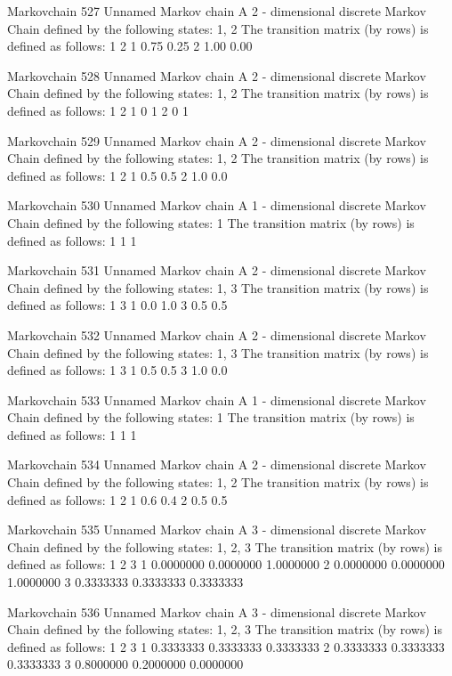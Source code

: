 \documentclass[
  nojss]{jss}
\begin{document}
\begin{CodeChunk}
\begin{CodeOutput}
Markovchain  527 
Unnamed Markov chain 
 A  2 - dimensional discrete Markov Chain defined by the following states: 
 1, 2 
 The transition matrix  (by rows)  is defined as follows: 
     1    2
1 0.75 0.25
2 1.00 0.00

Markovchain  528 
Unnamed Markov chain 
 A  2 - dimensional discrete Markov Chain defined by the following states: 
 1, 2 
 The transition matrix  (by rows)  is defined as follows: 
  1 2
1 0 1
2 0 1

Markovchain  529 
Unnamed Markov chain 
 A  2 - dimensional discrete Markov Chain defined by the following states: 
 1, 2 
 The transition matrix  (by rows)  is defined as follows: 
    1   2
1 0.5 0.5
2 1.0 0.0

Markovchain  530 
Unnamed Markov chain 
 A  1 - dimensional discrete Markov Chain defined by the following states: 
 1 
 The transition matrix  (by rows)  is defined as follows: 
  1
1 1

Markovchain  531 
Unnamed Markov chain 
 A  2 - dimensional discrete Markov Chain defined by the following states: 
 1, 3 
 The transition matrix  (by rows)  is defined as follows: 
    1   3
1 0.0 1.0
3 0.5 0.5

Markovchain  532 
Unnamed Markov chain 
 A  2 - dimensional discrete Markov Chain defined by the following states: 
 1, 3 
 The transition matrix  (by rows)  is defined as follows: 
    1   3
1 0.5 0.5
3 1.0 0.0

Markovchain  533 
Unnamed Markov chain 
 A  1 - dimensional discrete Markov Chain defined by the following states: 
 1 
 The transition matrix  (by rows)  is defined as follows: 
  1
1 1

Markovchain  534 
Unnamed Markov chain 
 A  2 - dimensional discrete Markov Chain defined by the following states: 
 1, 2 
 The transition matrix  (by rows)  is defined as follows: 
    1   2
1 0.6 0.4
2 0.5 0.5

Markovchain  535 
Unnamed Markov chain 
 A  3 - dimensional discrete Markov Chain defined by the following states: 
 1, 2, 3 
 The transition matrix  (by rows)  is defined as follows: 
          1         2         3
1 0.0000000 0.0000000 1.0000000
2 0.0000000 0.0000000 1.0000000
3 0.3333333 0.3333333 0.3333333

Markovchain  536 
Unnamed Markov chain 
 A  3 - dimensional discrete Markov Chain defined by the following states: 
 1, 2, 3 
 The transition matrix  (by rows)  is defined as follows: 
          1         2         3
1 0.3333333 0.3333333 0.3333333
2 0.3333333 0.3333333 0.3333333
3 0.8000000 0.2000000 0.0000000


\end{CodeOutput}
\end{CodeChunk}
\end{document}

